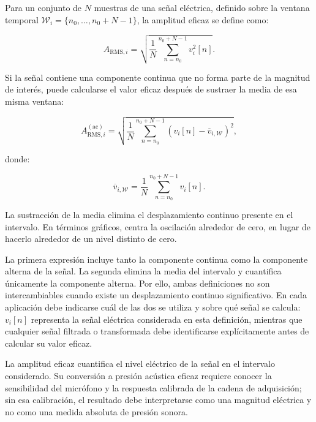 Para un conjunto de $N$ muestras de una señal eléctrica, definido
sobre la ventana temporal
$\mathcal{W}_i=\{n_0,\ldots,n_0+N-1\}$, la amplitud eficaz se define
como:

\begin{equation}
    A_{\mathrm{RMS},i}
    =
    \sqrt{
        \frac{1}{N}
        \sum_{n=n_0}^{n_0+N-1}v_i^2[n]
    }.
    \label{eq:amplitud_rms}
\end{equation}

Si la señal contiene una componente continua que no forma parte de la
magnitud de interés, puede calcularse el valor eficaz después de
sustraer la media de esa misma ventana:

\begin{equation}
    A_{\mathrm{RMS},i}^{(\mathrm{ac})}
    =
    \sqrt{
        \frac{1}{N}
        \sum_{n=n_0}^{n_0+N-1}
        \left(v_i[n]-\overline{v}_{i,\mathcal{W}}\right)^2
    },
    \label{eq:amplitud_rms_ac}
\end{equation}

donde:

\begin{equation}
    \overline{v}_{i,\mathcal{W}}
    =
    \frac{1}{N}
    \sum_{n=n_0}^{n_0+N-1}v_i[n].
\end{equation}

La sustracción de la media elimina el desplazamiento continuo presente
en el intervalo. En términos gráficos, centra la oscilación alrededor
de cero, en lugar de hacerlo alrededor de un nivel distinto de cero.

La primera expresión incluye tanto la componente continua como la
componente alterna de la señal. La segunda elimina la media del intervalo
y cuantifica únicamente la componente alterna. Por ello, ambas
definiciones no son intercambiables cuando existe un desplazamiento
continuo significativo. En cada aplicación debe indicarse cuál de las
dos se utiliza y sobre qué señal se calcula: $v_i[n]$ representa la
señal eléctrica considerada en esta definición, mientras que cualquier
señal filtrada o transformada debe identificarse explícitamente antes
de calcular su valor eficaz.

La amplitud eficaz cuantifica el nivel eléctrico de la señal en el
intervalo considerado. Su conversión a presión acústica eficaz requiere
conocer la sensibilidad del micrófono y la respuesta calibrada de la
cadena de adquisición; sin esa calibración, el resultado debe
interpretarse como una magnitud eléctrica y no como una medida absoluta
de presión sonora.

